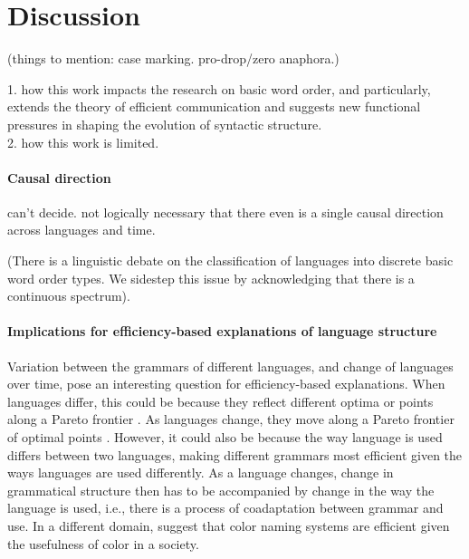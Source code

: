 \documentclass[11pt,a4paper]{article}
\newcommand\mhahn[1]{{\color{red}(#1)}}
\begin{document}







\section{Discussion}

\mhahn{things to mention: case marking. pro-drop/zero anaphora.}

{\color{blue} 1. how this work impacts the research on basic word order, and particularly, extends the theory of efficient communication and suggests new functional pressures in shaping the evolution of syntactic structure.}\\

{\color{blue} 2. how this work is limited.}

\paragraph{Causal direction} can't decide. not logically necessary that there even is a single causal direction across languages and time.


(There is a linguistic debate on the classification of languages into discrete basic word order types. We sidestep this issue by acknowledging that there is a continuous spectrum).


\paragraph{Implications for efficiency-based explanations of language structure}
Variation between the grammars of different languages, and change of languages over time, pose an interesting question for efficiency-based explanations.
When languages differ, this could be because they reflect different optima or points along a Pareto frontier \citep{zaslavsky2018efficient, hahn2020universals}.
As languages change, they move along a Pareto frontier of optimal points \citep{zaslavsky2019evolution}.
However, it could also be because the way language is used differs between two languages, making different grammars most efficient given the ways languages are used differently.
As a language changes, change in grammatical structure then has to be accompanied by change in the way the language is used, i.e., there is a process of {coadaptation} between grammar and use.
In a different domain, \cite{gibson2017color} suggest that color naming systems are efficient given the usefulness of color in a society.
\end{document}
